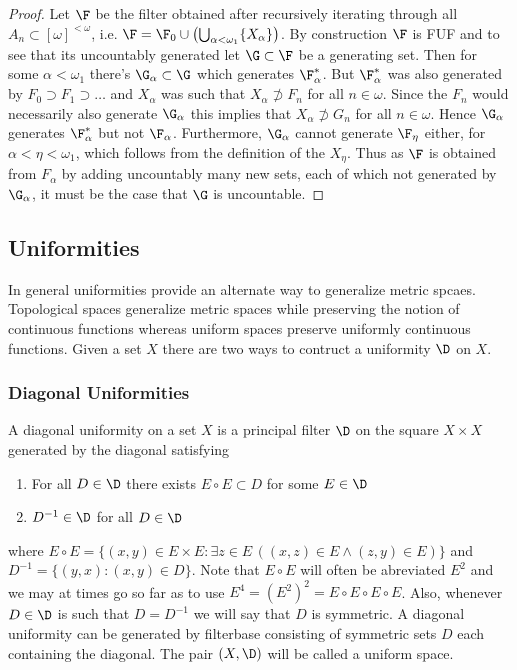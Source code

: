 \documentclass{article}
\begin{document}
\begin{proof}
    Let \(\F\) be the filter obtained after recursively iterating through all \(A_n \subset [\omega]^{<\omega}\), i.e. \(\F = \F_0 \cup \left(\bigcup_{\alpha < \omega_1}\{X_\alpha\}\right)\). By construction \(\F\) is FUF and to see that its uncountably generated let \(\G \subset \F\) be a generating set. Then for some \(\alpha < \omega_1\) there's \(\G_{\alpha} \subset \G\) which generates \(\F_{\alpha}^{\ast}\). But \(\F_{\alpha}^{\ast}\) was also generated by \(F_0 \supset F_1 \supset \dots\) and \(X_{\alpha}\) was such that \(X_{\alpha}\not\supset F_n\) for all \(n \in \omega\). Since the \(F_n\) would necessarily also generate \(\G_{\alpha}\) this implies that \(X_{\alpha} \not \supset G_n\) for all \(n \in \omega\). Hence \(\G_{\alpha}\) generates \(\F_{\alpha}^{\ast}\) but not \(\F_{\alpha}\). Furthermore, \(\G_{\alpha}\) cannot generate \(\F_{\eta}\) either, for \(\alpha < \eta < \omega_1\), which follows from the definition of the \(X_{\eta}\). Thus as \(\F\) is obtained from \(F_{\alpha}\) by adding uncountably many new sets, each of which not generated by \(\G_{\alpha}\), it must be the case that \(\G\) is uncountable. 
\end{proof}

\subsection{Uniformities}
    In general uniformities provide an alternate way to generalize metric spcaes. Topological spaces generalize metric spaces while preserving the notion of continuous functions whereas uniform spaces preserve  uniformly continuous functions. Given a set \(X\) there are two ways to contruct a uniformity \(\D\) on \(X\). 
    
\subsubsection{Diagonal Uniformities}
    A diagonal uniformity on a set \(X\) is a principal filter \(\D\) on the square \(X \times X\) generated by the diagonal satisfying 
    \begin{enumerate}
        \item For all \(D \in \D\) there exists \(E \circ E \subset D\) for some \(E \in \D\)
        \item \(D^{-1} \in \D\) for all \(D \in \D\)
    \end{enumerate}
    where \(E \circ E  = \{(x, y) \in E \times E: \exists z \in E\,((x,z) \in E \wedge (z, y) \in E)\}\) and \(D^{-1} = \{(y, x): (x, y) \in D\}\). Note that \(E\circ E\) will often be abreviated \(E^2\) and we may at times go so far as to use \(E^4 = (E^2)^2 = E\circ E\circ E\circ E\). Also, whenever \(D \in \D\) is such that \(D = D^{-1}\) we will say that \(D\) is symmetric. A diagonal uniformity can be generated by filterbase consisting of symmetric sets \(D\) each containing the diagonal. The pair \((X, \D)\) will be called a uniform space.
\end{document}
